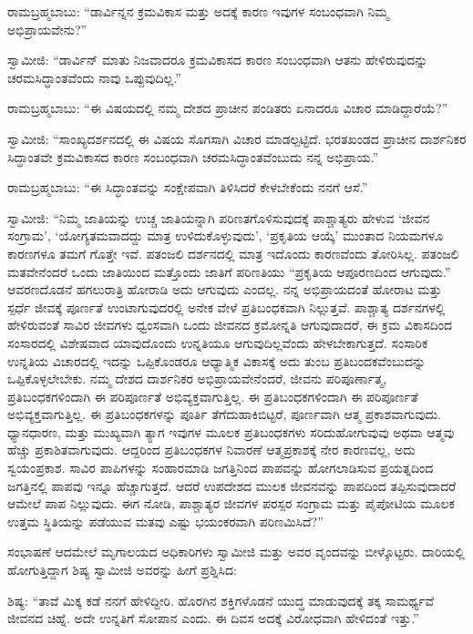  ರಾಮಬ್ರಹ್ಮಬಾಬು: “ಡಾರ್ವಿನ್ನನ ಕ್ರಮವಿಕಾಸ ಮತ್ತು ಅದಕ್ಕೆ ಕಾರಣ ಇವುಗಳ ಸಂಬಂಧವಾಗಿ ನಿಮ್ಮ ಅಭಿಪ್ರಾಯವೇನು?” 

 ಸ್ವಾಮೀಜಿ: “ಡಾರ್ವಿನ್ ಮಾತು ನಿಜವಾದರೂ ಕ್ರಮವಿಕಾಸದ ಕಾರಣ ಸಂಬಂಧವಾಗಿ ಆತನು ಹೇಳಿರುವುದನ್ನು ಚರಮಸಿದ್ಧಾಂತವೆಂದು ನಾವು ಒಪ್ಪುವುದಿಲ್ಲ.” 

 ರಾಮಬ್ರಹ್ಮಬಾಬು: “ಈ ವಿಷಯದಲ್ಲಿ ನಮ್ಮ ದೇಶದ ಪ್ರಾಚೀನ ಪಂಡಿತರು ಏನಾದರೂ ವಿಚಾರ ಮಾಡಿದ್ದಾರೆಯೆ?” 

 ಸ್ವಾಮೀಜಿ: “ಸಾಂಖ್ಯದರ್ಶನದಲ್ಲಿ ಈ ವಿಷಯ ಸೊಗಸಾಗಿ ವಿಚಾರ ಮಾಡಲ್ಪಟ್ಟಿದೆ. ಭರತಖಂಡದ ಪ್ರಾಚೀನ ದಾರ್ಶನಿಕರ ಸಿದ್ಧಾಂತವೇ ಕ್ರಮವಿಕಾಸದ ಕಾರಣ ಸಂಬಂಧವಾಗಿ ಚರಮಸಿದ್ಧಾಂತವೆಂಬುದು ನನ್ನ ಅಭಿಪ್ರಾಯ.” 

 ರಾಮಬ್ರಹ್ಮಬಾಬು: “ಈ ಸಿದ್ಧಾಂತವನ್ನು ಸಂಕ್ಷೇಪವಾಗಿ ತಿಳಿಸಿದರೆ ಕೇಳಬೇಕೆಂದು ನನಗೆ ಆಸೆ.” 

 ಸ್ವಾಮೀಜಿ: “ನಿಮ್ಮ ಜಾತಿಯನ್ನು ಉಚ್ಚ ಜಾತಿಯನ್ನಾಗಿ ಪರಿಣತಗೊಳಿಸುವುದಕ್ಕೆ ಪಾಶ್ಚಾತ್ಯರು ಹೇಳುವ ‘ಜೀವನ ಸಂಗ್ರಾಮ’, ‘ಯೋಗ್ಯತಮವಾದದ್ದು ಮಾತ್ರ ಉಳಿದುಕೊಳ್ಳುವುದು’, ‘ಪ್ರಕೃತಿಯ ಆಯ್ಕೆ’ ಮುಂತಾದ ನಿಯಮಗಳೂ ಕಾರಣಗಳೂ ತಮಗೆ ಗೊತ್ತೇ ಇವೆ. ಪತಂಜಲಿ ದರ್ಶನದಲ್ಲಿ ಮಾತ್ರ ಇದೊಂದು ಕಾರಣವೆಂದು ತೋರಿಸಿಲ್ಲ. ಪತಂಜಲಿ ಮತವೇನೆಂದರೆ ಒಂದು ಜಾತಿಯಿಂದ ಮತ್ತೊಂದು ಜಾತಿಗೆ ಪರಿಣತಿಯು “ಪ್ರಕೃತಿಯ ಆಪೂರಣದಿಂದ ಆಗುವುದು.” ಆವರಣದೊಡನೆ ಹಗಲುರಾತ್ರಿ ಹೋರಾಡಿ ಅದು ಆಗುವುದು ಎಂದಲ್ಲ. ನನ್ನ ಅಭಿಪ್ರಾಯದಂತೆ ಹೋರಾಟ ಮತ್ತು ಸ್ಪರ್ಧೆ ಜೀವಕ್ಕೆ ಪೂರ್ಣತೆ ಉಂಟಾಗುವುದರಲ್ಲಿ ಅನೇಕ ವೇಳೆ ಪ್ರತಿಬಂಧಕವಾಗಿ ನಿಲ್ಲುತ್ತವೆ. ಪಾಶ್ಚಾತ್ಯ ದರ್ಶನಗಳಲ್ಲಿ ಹೇಳಿರುವಂತೆ ಸಾವಿರ ಜೀವಗಳು ಧ್ವಂಸವಾಗಿ ಒಂದು ಜೀವನದ ಕ್ರಮೋನ್ನತಿ ಆಗುವುದಾದರೆ, ಈ ಕ್ರಮ ವಿಕಾಸದಿಂದ ಸಂಸಾರದಲ್ಲಿ ವಿಶೇಷವಾದ ಯಾವುದೊಂದು ಉನ್ನತಿಯೂ ಆಗುವುದಿಲ್ಲವೆಂದು ಹೇಳಬೇಕಾಗುತ್ತದೆ. ಸಂಸಾರಿಕ ಉನ್ನತಿಯ ವಿಚಾರದಲ್ಲಿ ಇದನ್ನು ಒಪ್ಪಿಕೊಂಡರೂ ಆಧ್ಯಾತ್ಮಿಕ ವಿಕಾಸಕ್ಕೆ ಅದು ತುಂಬ ಪ್ರತಿಬಂದಕವೆಂಬುದನ್ನು ಒಪ್ಪಿಕೊಳ್ಳಲೇಬೇಕು. ನಮ್ಮ ದೇಶದ ದಾರ್ಶನಿಕರ ಅಭಿಪ್ರಾಯವೇನೆಂದರೆ, ಜೀವನು ಪರಿಪೂರ್ಣಾತ್ಮ, ಪ್ರತಿಬಂಧಕಗಳಿಂದಾಗಿ ಈ ಪರಿಪೂರ್ಣತೆ ಅಭಿವ್ಯಕ್ತವಾಗುತ್ತಿಲ್ಲ. ಈ ಪ್ರತಿಬಂಧಕಗಳಿಂದಾಗಿ ಈ ಪರಿಪೂರ್ಣತೆ ಅಭಿವ್ಯಕ್ತವಾಗುತ್ತಿಲ್ಲ. ಈ ಪ್ರತಿಬಂಧಕಗಳನ್ನು ಪೂರ್ತಿ ತೆಗೆದುಹಾಕಿಬಿಟ್ಟರೆ, ಪೂರ್ಣವಾಗಿ ಆತ್ಮ ಪ್ರಕಾಶವಾಗುವುದು. ಧ್ಯಾನಧಾರಣ, ಮತ್ತು ಮುಖ್ಯವಾಗಿ ತ್ಯಾಗ ಇವುಗಳ ಮೂಲಕ ಪ್ರತಿಬಂಧಕಗಳು ಸರಿದುಹೋಗುವುವು ಅಥವಾ ಆತ್ಮವು ಹೆಚ್ಚು ಪ್ರಕಾಶಿತವಾಗುವುದು. ಆದ್ದರಿಂದ ಪ್ರತಿಬಂಧಕಗಳ ನಿವಾರಣೆ ಆತ್ಮಪ್ರಕಾಶಕ್ಕೆ ನೇರ ಕಾರಣವಲ್ಲ, ಅದು ಸ್ವಯಂಪ್ರಕಾಶ. ಸಾವಿರ ಪಾಪಿಗಳನ್ನು ಸಂಹಾರಮಾಡಿ ಜಗತ್ತಿನಿಂದ ಪಾಪವನ್ನು ಹೋಗಲಾಡಿಸುವ ಪ್ರಯತ್ನದಿಂದ ಜಗತ್ತಿನಲ್ಲಿ ಪಾಪವು ಇನ್ನೂ ಹೆಚ್ಚಾಗುತ್ತದೆ. ಆದರೆ ಉಪದೇಶದ ಮುಲಕ ಜೀವನವನ್ನು ಪಾಪದಿಂದ ತಪ್ಪಿಸುವುದಾದರೆ ಆಮೇಲೆ ಪಾಪ ನಿಲ್ಲುವುದು. ಈಗ ನೋಡಿ, ಪಾಶ್ಚಾತ್ಯರ ಜೀವಗಳ ಪರಸ್ಪರ ಸಂಗ್ರಾಮ ಮತ್ತು ಪೈಪೋಟಿಯ ಮೂಲಕ ಉತ್ತಮ ಸ್ಥಿತಿಯನ್ನು ಪಡೆಯುವ ಮತವು ಎಷ್ಟು ಭಯಂಕರವಾಗಿ ಪರಿಣಮಿಸಿದೆ?” 

 ಸಂಭಾಷಣೆ ಆದಮೇಲೆ ಮೃಗಾಲಯದ ಅಧಿಕಾರಿಗಳು ಸ್ವಾಮೀಜಿ ಮತ್ತು ಅವರ ವೃಂದವನ್ನು ಬೀಳ್ಕೊಟ್ಟರು. ದಾರಿಯಲ್ಲಿ ಹೋಗುತ್ತಿದ್ದಾಗ ಶಿಷ್ಯ ಸ್ವಾಮೀಜಿ ಅವರನ್ನು ಹೀಗೆ ಪ್ರಶ್ನಿಸಿದ: 

 ಶಿಷ್ಯ: “ತಾವೆ ಮಿಕ್ಕ ಕಡೆ ನನಗೆ ಹೇಳಿದ್ದೀರಿ. ಹೊರಗಿನ ಶಕ್ತಿಗಳೊಡನೆ ಯುದ್ಧ ಮಾಡುವುದಕ್ಕೆ ತಕ್ಕ ಸಾಮರ್ಥ್ಯವೆ ಜೀವನದ ಚಿಹ್ನೆ. ಅದೇ ಉನ್ನತಿಗೆ ಸೋಪಾನ ಎಂದು. ಈ ದಿವಸ ಅದಕ್ಕೆ ವಿರೋಧವಾಗಿ ಹೇಳಿದಂತೆ ಇತ್ತು.” 

